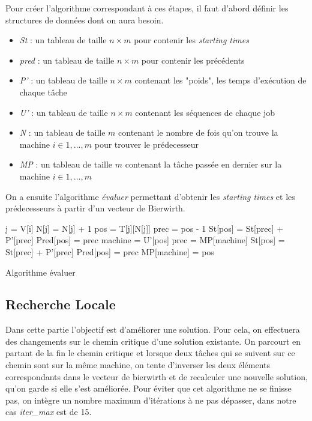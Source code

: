 \documentclass{article}
\begin{document}
Pour créer l'algorithme correspondant à ces étapes, il faut d'abord définir
les structures de données dont on aura besoin.
\begin{itemize}[label=$\bullet$]
  \item \emph{St} : un tableau de taille $n\times m$ pour contenir les \emph{starting times}
  \item \emph{pred} : un tableau de taille $n\times m$ pour contenir les précédents
  \item \emph{P'} : un tableau de taille $n\times m$ contenant les "poids", les temps d'exécution de chaque tâche
  \item \emph{U'} : un tableau de taille $n\times m$ contenant les séquences de chaque job
  \item \emph{N} : un tableau de taille $m$ contenant le nombre de fois qu'on trouve la machine $i \in 1,...,m$ pour trouver le prédecesseur
  \item \emph{MP} : un tableau de taille $m$ contenant la tâche passée en dernier sur la machine $i \in 1,...,m$
\end{itemize}

\vspace{0.25cm}
On a ensuite l'algorithme \emph{évaluer} permettant d'obtenir les \emph{starting times} et les prédecesseurs à
partir d'un vecteur de Bierwirth.

\begin{algorithm}[H]
    {
      j = V[i]\;
      N[j] = N[j] + 1\;
      pos = T[j][N[j]]\;
      {
        prec = pos - 1\;
        {
          St[pos] = St[prec] + P'[prec]\;
          Pred[pos] = prec\;
        }
      }
      machine = U'[pos]\;
      {
        prec = MP[machine]\;
        {
          St[pos] = St[prec] + P'[prec]\;
          Pred[pos] = prec\;
        }
      }
      MP[machine] = pos\;
    }
    \caption{Algorithme évaluer}
\end{algorithm}

\newpage
\subsection{Recherche Locale}
Dans cette partie l'objectif est d'améliorer une solution. Pour cela, on effectuera des
changements sur le chemin critique d'une solution existante. On parcourt en partant de la
fin le chemin critique et lorsque deux tâches qui se suivent sur ce chemin sont sur la
même machine, on tente d'inverser les deux éléments correspondants dans le vecteur de
bierwirth et de recalculer une nouvelle solution, qu'on garde si elle s'est améliorée.
Pour éviter que cet algorithme ne se finisse pas, on intègre un nombre maximum d'itérations
à ne pas dépasser, dans notre cas \emph{iter\_max} est de 15.
\end{document}
